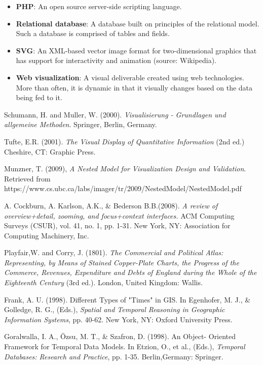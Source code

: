 \documentclass[12pt]{article}
\begin{document}
\begin{itemize}
\item[] \textbf{PHP}: An open source server-side scripting language.
\item[] \textbf{Relational database}: A database built on principles of the relational model. Such a database is comprised of tables and fields.
\item[] \textbf{SVG}: An XML-based vector image format for two-dimensional graphics that has support for interactivity and animation (source: Wikipedia).
\item[] \textbf{Web visualization}: A visual deliverable created using web technologies. More than often, it is dynamic in that it visually changes based on the data being fed to it. 
\end{itemize}

\vfill

\begin{thebibliography}{1}

   Schumann, H. and Muller, W. (2000). {\em Visualisierung - Grundlagen und allgemeine Methoden}. Springer, Berlin, Germany.

    Tufte, E.R. (2001). {\em The Visual Display of Quantitative Information} (2nd ed.) Cheshire, CT: Graphic Press.

   Munzner, T. (2009), {\em A Nested Model for Visualization Design and Validation}. Retrieved from \\ https://www.cs.ubc.ca/labs/imager/tr/2009/NestedModel/NestedModel.pdf

   A. Cockburn, A. Karlson, A.K., \& Bederson B.B.(2008). {\em A review of overview+detail, zooming, and focus+context interfaces.} ACM Computing Surveys (CSUR), vol. 41, no. 1, pp. 1-31. New York, NY: Association for Computing Machinery, Inc.
  
   Playfair,W. and Corry, J. (1801). {\em The Commercial and Political Atlas: Representing,
by Means of Stained Copper-Plate Charts, the Progress of the Commerce,
Revenues, Expenditure and Debts of England during the Whole of
the Eighteenth Century} (3rd ed.). London, United Kingdom: Wallis.
  
   Frank, A. U. (1998). Different Types of "Times" in GIS. In Egenhofer, M. J.,
\& Golledge, R. G., (Eds.), {\em Spatial and Temporal Reasoning in Geographic
Information Systems}, pp. 40-62. New York, NY: Oxford University Press.

   Goralwalla, I. A., \"{O}zsu, M. T., \& Szafron, D. (1998). An Object-
Oriented Framework for Temporal Data Models. In Etzion, O., et al., (Eds.), {\em Temporal Databases: Research and Practice}, pp. 1-35. Berlin,Germany: Springer.
  

\end{thebibliography}
\end{document}

